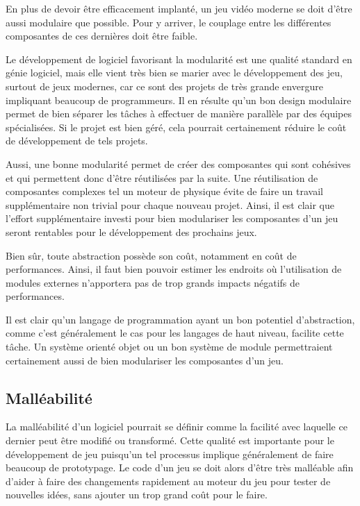 \documentclass[12pt,oneside,letterpaper,francais]{book}
\begin{document}
En plus de devoir être efficacement implanté, un jeu vidéo moderne se
doit d'être aussi modulaire que possible. Pour y arriver, le couplage
entre les différentes composantes de ces dernières doit être faible. 

Le développement de logiciel favorisant la modularité est une qualité
standard en génie logiciel, mais elle vient très bien se marier avec
le développement des jeu, surtout de jeux modernes, car ce sont des
projets de très grande envergure impliquant beaucoup de
programmeurs. Il en résulte qu'un bon design modulaire permet de bien
séparer les tâches à effectuer de manière parallèle par des équipes
spécialisées. Si le projet est bien géré, cela pourrait certainement
réduire le coût de développement de tels projets.

Aussi, une bonne modularité permet de créer des composantes qui sont
cohésives et qui permettent donc d'être réutilisées par la suite. Une
réutilisation de composantes complexes tel un moteur de physique évite
de faire un travail supplémentaire non trivial pour chaque nouveau
projet. Ainsi, il est clair que l'effort supplémentaire investi pour
bien modulariser les composantes d'un jeu seront rentables pour le
développement des prochains jeux.

Bien sûr, toute abstraction possède son coût, notamment en coût de
performances. Ainsi, il faut bien pouvoir estimer les endroits où
l'utilisation de modules externes n'apportera pas de trop grands
impacts négatifs de performances.

Il est clair qu'un langage de programmation ayant un bon potentiel
d'abstraction, comme c'est généralement le cas pour les langages de
haut niveau, facilite cette tâche. Un système orienté objet ou un bon
système de module permettraient certainement aussi de bien modulariser
les composantes d'un jeu.

\subsection{Malléabilité}

La malléabilité d'un logiciel pourrait se définir comme la facilité
avec laquelle ce dernier peut être modifié ou transformé. Cette
qualité est importante pour le développement de jeu puisqu'un tel
processus implique généralement de faire beaucoup de prototypage. Le
code d'un jeu se doit alors d'être très malléable afin d'aider à faire
des changements rapidement au moteur du jeu pour tester de nouvelles
idées, sans ajouter un trop grand coût pour le faire.
\end{document}
